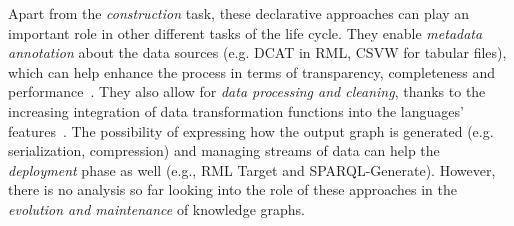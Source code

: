 Apart from the \textit{construction} task, these declarative approaches can play an important role in other different tasks of the life cycle. They enable \textit{metadata annotation} about the data sources (e.g. DCAT in RML, CSVW for tabular files), which can help enhance the process in terms of transparency, completeness and performance~\parencite{chaves2021morph-csv,vidal2023knowledge}. 
They also allow for \textit{data processing and cleaning}, thanks to the increasing integration of data transformation functions into the languages' features~\parencite{debruyne2016r2rmlf,junior2016funul,jozashoori2020funmap,DeMeester2017fno_dbpedia}.
The possibility of expressing how the output graph is generated (e.g. serialization, compression) and managing streams of data can help the \textit{deployment} phase as well (e.g., RML Target and SPARQL-Generate). However, there is no analysis so far looking into the role of these approaches in the \textit{evolution and maintenance} of knowledge graphs. 



